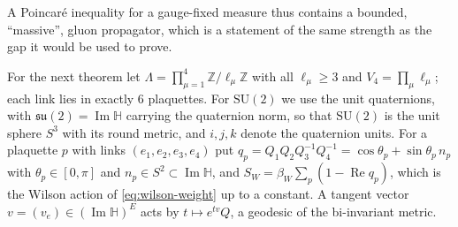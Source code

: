 \documentclass[11pt,a4paper]{amsart}
\theoremstyle{definition}
\theoremstyle{remark}
\numberwithin{equation}{section}
\newcommand{\Z}{\mathbb{Z}}          %
\newcommand{\SU}{\mathrm{SU}}              %
\newcommand{\betaW}{\beta_{W}}             %
\begin{document}
A Poincar\'e inequality for a gauge-fixed measure thus contains a bounded, ``massive'', gluon propagator, which is a statement of the same strength as the gap it would be used to prove.

For the next theorem let $\Lambda=\prod_{\mu=1}^4\Z/\ell_\mu\Z$ with all $\ell_\mu\ge3$ and $V_4=\prod_\mu\ell_\mu$; each link lies in exactly $6$ plaquettes. For $\SU(2)$ we use the unit quaternions, with $\mathfrak{su}(2)=\operatorname{Im}\mathbb H$ carrying the quaternion norm, so that $\SU(2)$ is the unit sphere $S^3$ with its round metric, and $i,j,k$ denote the quaternion units. For a plaquette $p$ with links $(e_1,e_2,e_3,e_4)$ put $q_p=Q_1Q_2Q_3^{-1}Q_4^{-1}=\cos\theta_p+\sin\theta_p\,n_p$ with $\theta_p\in[0,\pi]$ and $n_p\in S^2\subset\operatorname{Im}\mathbb H$, and $S_W=\betaW\sum_p(1-\operatorname{Re}q_p)$, which is the Wilson action of \eqref{eq:wilson-weight} up to a constant. A tangent vector $v=(v_e)\in(\operatorname{Im}\mathbb H)^E$ acts by $t\mapsto e^{tv}Q$, a geodesic of the bi-invariant metric.
\end{document}
